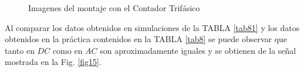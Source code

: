 \documentclass[twocolumn]{IEEEtran}
\begin{document}
\begin{figure}[H]
 \centering
  \hspace{2cm}
  \caption{Imagenes del montaje con el Contador Trifásico}
    \label{fig7}
\end{figure}
\noindent
Al comparar los datos obtenidos en simulaciones de la TABLA \ref{tab81} y los datos obtenidos en la práctica contenidos en la TABLA \ref{tab8} se puede observar que tanto en $DC$ como en $AC$ son aproximadamente iguales y se obtienen de la señal mostrada en la Fig. \ref{fig15}.
\end{document}
